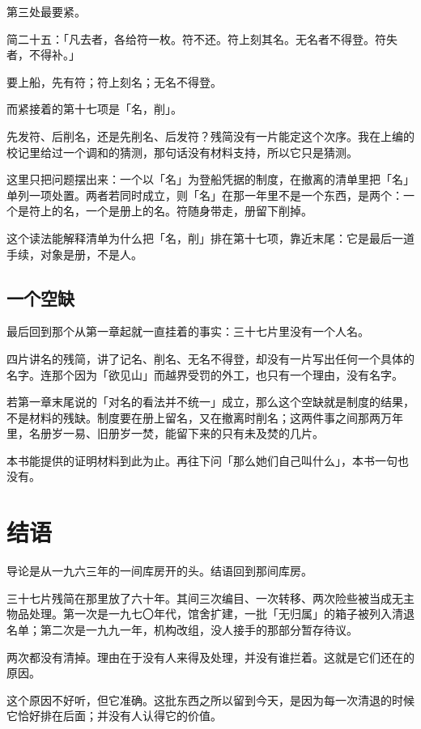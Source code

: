 第三处最要紧。

简二十五：「凡去者，各给符一枚。符不还。符上刻其名。无名者不得登。符失者，不得补。」

要上船，先有符；符上刻名；无名不得登。

而紧接着的第十七项是「名，削」。

先发符、后削名，还是先削名、后发符？残简没有一片能定这个次序。我在上编的校记里给过一个调和的猜测，那句话没有材料支持，所以它只是猜测。

这里只把问题摆出来：一个以「名」为登船凭据的制度，在撤离的清单里把「名」单列一项处置。两者若同时成立，则「名」在那一年里不是一个东西，是两个：一个是符上的名，一个是册上的名。符随身带走，册留下削掉。

这个读法能解释清单为什么把「名，削」排在第十七项，靠近末尾：它是最后一道手续，对象是册，不是人。

\section{一个空缺}

最后回到那个从第一章起就一直挂着的事实：三十七片里没有一个人名。

四片讲名的残简，讲了记名、削名、无名不得登，却没有一片写出任何一个具体的名字。连那个因为「欲见山」而越界受罚的外工，也只有一个理由，没有名字。

若第一章末尾说的「对名的看法并不统一」成立，那么这个空缺就是制度的结果，不是材料的残缺。制度要在册上留名，又在撤离时削名；这两件事之间那两万年里，名册岁一易、旧册岁一焚，能留下来的只有未及焚的几片。

本书能提供的证明材料到此为止。再往下问「那么她们自己叫什么」，本书一句也没有。

\chapter*{结\quad 语}
{}

导论是从一九六三年的一间库房开的头。结语回到那间库房。

三十七片残简在那里放了六十年。其间三次编目、一次转移、两次险些被当成无主物品处理。第一次是一九七〇年代，馆舍扩建，一批「无归属」的箱子被列入清退名单；第二次是一九九一年，机构改组，没人接手的那部分暂存待议。

两次都没有清掉。理由在于没有人来得及处理，并没有谁拦着。这就是它们还在的原因。

这个原因不好听，但它准确。这批东西之所以留到今天，是因为每一次清退的时候它恰好排在后面；并没有人认得它的价值。

